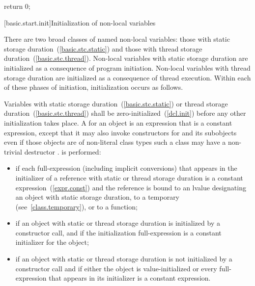 \begin{codeblock}
return 0;
\end{codeblock}

[basic.start.init]{Initialization of non-local variables}

\pnum
{}%
%
There are two broad classes of named non-local variables: those with static storage
duration~(\ref{basic.stc.static}) and those with thread storage
duration~(\ref{basic.stc.thread}). Non-local variables with static storage duration
are initialized as a consequence of program initiation. Non-local variables with
thread storage duration are initialized as a consequence of thread execution.
Within each of these phases of initiation, initialization occurs as follows.

\pnum
{}%
%
%
%
%
Variables with static storage duration~(\ref{basic.stc.static}) or thread storage
duration~(\ref{basic.stc.thread}) shall be zero-initialized~(\ref{dcl.init}) before
any other initialization takes place.
A  for an object  is an expression that is a
constant expression, except that it may also invoke  constructors
for  and its subobjects even if those objects are of non-literal class
types \enternote such a class may have a non-trivial destructor \exitnote.
%
 is performed:

\begin{itemize}
\item
if each full-expression (including implicit conversions) that appears in
the initializer of a reference with static or thread storage duration is a
constant expression~(\ref{expr.const}) and the reference is bound to an lvalue
designating an object with static storage duration, to a temporary
(see~\ref{class.temporary}), or to a function;

\item
if an object with static or thread storage duration is initialized
by a constructor call, and if the initialization full-expression is a constant
initializer for the object;

\item
if an object with static or thread storage duration is not initialized by a constructor call
and if either the object is value-initialized or every full-expression that
appears in its initializer is a constant expression.

\end{itemize}

